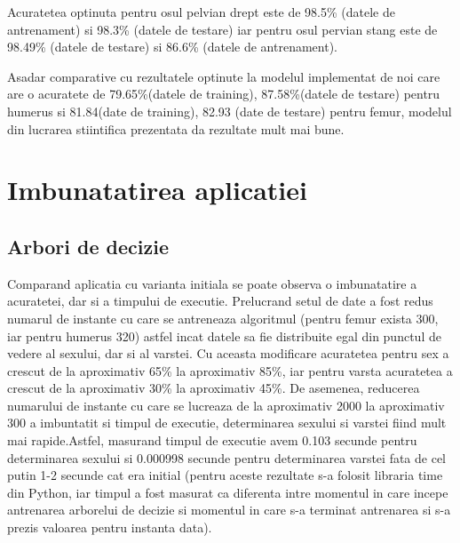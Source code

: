 \documentclass[runningheads,a4paper,11pt]{report}
\begin{document}
\hfill \break
\hfill \break

\noindent Acuratetea optinuta pentru osul pelvian drept este de 98.5\% (datele de antrenament) si 98.3\% (datele de testare) iar pentru osul pervian stang este de 98.49\% (datele de testare) si 86.6\% (datele de antrenament).

\hfill \break

\noindent Asadar comparative cu rezultatele optinute la modelul implementat de noi care are o acuratete de 79.65\%(datele de training), 87.58\%(datele de testare) pentru humerus si 81.84(date de training), 82.93 (date de testare)
pentru femur, modelul din lucrarea stiintifica prezentata da rezultate mult mai bune.

\chapter{Imbunatatirea aplicatiei}
\label{chapter:complexitate}

\section{Arbori de decizie}
\label{arboriDeDecizieComplecitate}
Comparand aplicatia cu varianta initiala se poate observa o imbunatatire a acuratetei, dar si a timpului de executie. Prelucrand setul de date a fost redus numarul de instante cu care se antreneaza algoritmul (pentru femur exista 300, iar pentru humerus 320) astfel incat datele sa fie distribuite egal din punctul de vedere al sexului, dar si al varstei. Cu aceasta modificare acuratetea pentru sex a crescut de la aproximativ 65\% la aproximativ 85\%, iar pentru varsta acuratetea a crescut de la aproximativ 30\% la aproximativ 45\%. De asemenea, reducerea numarului de instante cu care se lucreaza de la aproximativ 2000 la aproximativ 300 a imbuntatit si timpul de executie, determinarea sexului si varstei fiind mult mai rapide.Astfel, masurand timpul de executie avem 0.103 secunde pentru determinarea sexului si 0.000998 secunde pentru determinarea varstei fata de cel putin 1-2 secunde cat era initial (pentru aceste rezultate s-a folosit libraria time din Python, iar timpul a fost masurat ca diferenta intre momentul in care incepe antrenarea arborelui de decizie si momentul in care s-a terminat antrenarea si s-a prezis valoarea pentru instanta data).
\end{document}
